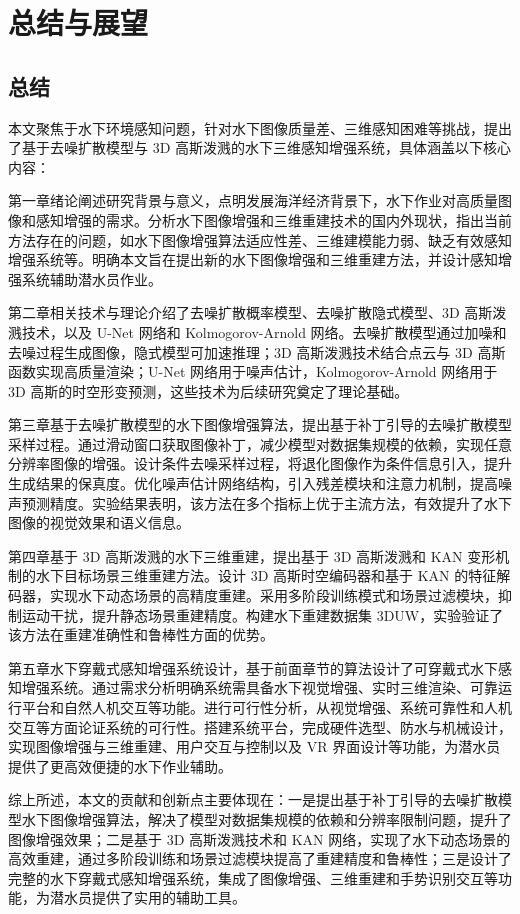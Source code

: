 \chapter{总结与展望}
\section{总结}
本文聚焦于水下环境感知问题，针对水下图像质量差、三维感知困难等挑战，提出了基于去噪扩散模型与 3D 高斯泼溅的水下三维感知增强系统，具体涵盖以下核心内容：

第一章绪论阐述研究背景与意义，点明发展海洋经济背景下，水下作业对高质量图像和感知增强的需求。分析水下图像增强和三维重建技术的国内外现状，指出当前方法存在的问题，如水下图像增强算法适应性差、三维建模能力弱、缺乏有效感知增强系统等。明确本文旨在提出新的水下图像增强和三维重建方法，并设计感知增强系统辅助潜水员作业。

第二章相关技术与理论介绍了去噪扩散概率模型、去噪扩散隐式模型、3D 高斯泼溅技术，以及 U-Net 网络和 Kolmogorov-Arnold 网络。去噪扩散模型通过加噪和去噪过程生成图像，隐式模型可加速推理；3D 高斯泼溅技术结合点云与 3D 高斯函数实现高质量渲染；U-Net 网络用于噪声估计，Kolmogorov-Arnold 网络用于 3D 高斯的时空形变预测，这些技术为后续研究奠定了理论基础。

第三章基于去噪扩散模型的水下图像增强算法，提出基于补丁引导的去噪扩散模型采样过程。通过滑动窗口获取图像补丁，减少模型对数据集规模的依赖，实现任意分辨率图像的增强。设计条件去噪采样过程，将退化图像作为条件信息引入，提升生成结果的保真度。优化噪声估计网络结构，引入残差模块和注意力机制，提高噪声预测精度。实验结果表明，该方法在多个指标上优于主流方法，有效提升了水下图像的视觉效果和语义信息。

第四章基于 3D 高斯泼溅的水下三维重建，提出基于 3D 高斯泼溅和 KAN 变形机制的水下目标场景三维重建方法。设计 3D 高斯时空编码器和基于 KAN 的特征解码器，实现水下动态场景的高精度重建。采用多阶段训练模式和场景过滤模块，抑制运动干扰，提升静态场景重建精度。构建水下重建数据集 3DUW，实验验证了该方法在重建准确性和鲁棒性方面的优势。

第五章水下穿戴式感知增强系统设计，基于前面章节的算法设计了可穿戴式水下感知增强系统。通过需求分析明确系统需具备水下视觉增强、实时三维渲染、可靠运行平台和自然人机交互等功能。进行可行性分析，从视觉增强、系统可靠性和人机交互等方面论证系统的可行性。搭建系统平台，完成硬件选型、防水与机械设计，实现图像增强与三维重建、用户交互与控制以及 VR 界面设计等功能，为潜水员提供了更高效便捷的水下作业辅助。

综上所述，本文的贡献和创新点主要体现在：一是提出基于补丁引导的去噪扩散模型水下图像增强算法，解决了模型对数据集规模的依赖和分辨率限制问题，提升了图像增强效果；二是基于 3D 高斯泼溅技术和 KAN 网络，实现了水下动态场景的高效重建，通过多阶段训练和场景过滤模块提高了重建精度和鲁棒性；三是设计了完整的水下穿戴式感知增强系统，集成了图像增强、三维重建和手势识别交互等功能，为潜水员提供了实用的辅助工具。

